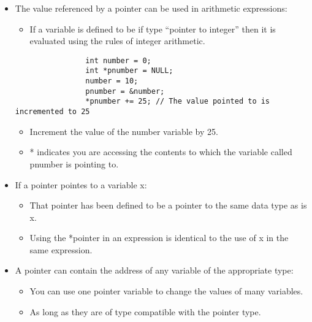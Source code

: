 \begin{itemize}
    \item The value referenced by a pointer can be used in arithmetic expressions:
        \begin{itemize}
            \item If a variable is defined to be if type ``pointer to integer'' then it is evaluated using the rules of integer arithmetic. 
        \end{itemize}
            \begin{verbatim}
                int number = 0; 
                int *pnumber = NULL; 
                number = 10; 
                pnumber = &number; 
                *pnumber += 25; // The value pointed to is incremented to 25
            \end{verbatim}
    \begin{itemize}
        \item Increment the value of the number variable by 25. 
    \end{itemize}
        \begin{itemize}
            \item * indicates you are accessing the contents to which the variable called pnumber is pointing to. 
        \end{itemize}
    
    \item If a pointer pointes to a variable x:
        \begin{itemize}
            \item That pointer has been defined to be a pointer to the same data type as is x. 
            \item Using the *pointer in an expression is identical to the use of x in the same expression. 
        \end{itemize}
    
    \item A pointer can contain the address of any variable of the appropriate type:
        \begin{itemize}
            \item You can use one pointer variable to change the values of many variables. 
            \item As long as they are of type compatible with the pointer type. 
        \end{itemize}
\end{itemize}

